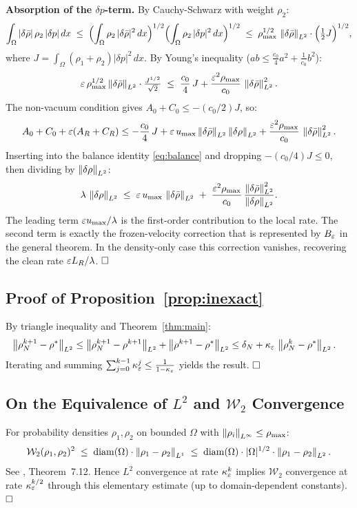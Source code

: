 \noindent\textbf{Absorption of the $\delta p$-term.}
By Cauchy-Schwarz with weight $\rho_2$:
\[
  \int_\Omega |\delta\bar\rho|\,\rho_2\,|\delta p|\,dx
  \;\leq\;
  \Bigl(\int_\Omega \rho_2\,|\delta\bar\rho|^2\,dx\Bigr)^{1/2}
  \Bigl(\int_\Omega \rho_2\,|\delta p|^2\,dx\Bigr)^{1/2}
  \;\leq\;
  \rho_{\max}^{1/2}\,\left\lVert \delta\bar\rho \right\rVert_{L^2}\cdot
  \Bigl(\tfrac{1}{2}J\Bigr)^{1/2},
\]
where $J = \int_\Omega(\rho_1+\rho_2)|\delta p|^2\,dx$.
By Young's inequality ($ab \leq \frac{c_0}{4}a^2 + \frac{1}{c_0}b^2$):
\[
  \varepsilon\,\rho_{\max}^{1/2}\left\lVert \delta\bar\rho \right\rVert_{L^2}\cdot\tfrac{J^{1/2}}{\sqrt 2}
  \;\leq\; \frac{c_0}{4}\,J + \frac{\varepsilon^2\rho_{\max}}{c_0}\,\left\lVert \delta\bar\rho \right\rVert_{L^2}^2.
\]
The non-vacuum condition gives $A_0+C_0 \leq -(c_0/2)J$, so:
\[
  A_0+C_0 + \varepsilon(A_R+C_R)
  \leq -\frac{c_0}{4}\,J
  + \varepsilon\,u_{\max}\left\lVert \delta\bar\rho \right\rVert_{L^2}\left\lVert \delta\rho \right\rVert_{L^2}
  + \frac{\varepsilon^2\rho_{\max}}{c_0}\,\left\lVert \delta\bar\rho \right\rVert_{L^2}^2.
\]
Inserting into the balance identity \eqref{eq:balance} and dropping
$-(c_0/4)J \leq 0$, then dividing by $\left\lVert \delta\rho \right\rVert_{L^2}$:
\[
  \lambda\,\left\lVert \delta\rho \right\rVert_{L^2}
  \;\leq\;
  \varepsilon\,u_{\max}\,\left\lVert \delta\bar\rho \right\rVert_{L^2}
  \;+\; \frac{\varepsilon^2\rho_{\max}}{c_0}\,
        \frac{\left\lVert \delta\bar\rho \right\rVert_{L^2}^2}{\left\lVert \delta\rho \right\rVert_{L^2}}.
\]
The leading term $\varepsilon u_{\max}/\lambda$ is the first-order contribution to
the local rate.  The second term is exactly the frozen-velocity correction that
is represented by \(B_\varepsilon\) in the general theorem.  In the density-only case
this correction vanishes, recovering the clean rate
\(\varepsilon L_R/\lambda\). $\hfill\square$

\subsection{Proof of Proposition~\ref{prop:inexact}}

By triangle inequality and Theorem~\ref{thm:main}:
\begin{align*}
  \left\lVert \rho^{k+1}_N - \rho^* \right\rVert_{L^2}
  &\leq \left\lVert \rho^{k+1}_N - \rho^{k+1} \right\rVert_{L^2}
   + \left\lVert \rho^{k+1} - \rho^* \right\rVert_{L^2}
  \leq \delta_N + \kappa_\varepsilon\,\left\lVert \rho^k_N - \rho^* \right\rVert_{L^2}.
\end{align*}
Iterating and summing
$\sum_{j=0}^{k-1}\kappa_\varepsilon^j \leq \frac{1}{1-\kappa_\varepsilon}$
yields the result. $\hfill\square$

\subsection{On the Equivalence of $L^2$ and $\mathcal{W}_2$ Convergence}
\label{app:wasserstein}

For probability densities $\rho_1,\rho_2$ on bounded $\Omega$ with
$\left\lVert \rho_i \right\rVert_{L^\infty} \leq \rho_{\max}$:
\[
  \mathcal{W}_2(\rho_1,\rho_2)^2
  \;\leq\; \mathrm{diam}(\Omega)\cdot\left\lVert \rho_1-\rho_2 \right\rVert_{L^1}
  \;\leq\; \mathrm{diam}(\Omega)\cdot|\Omega|^{1/2}\cdot\left\lVert \rho_1-\rho_2 \right\rVert_{L^2}.
\]
See \citet{villani2009optimal}, Theorem~7.12.
Hence $L^2$ convergence at rate $\kappa_\varepsilon^k$ implies $\mathcal{W}_2$
convergence at rate $\kappa_\varepsilon^{k/2}$ through this elementary estimate
(up to domain-dependent constants). $\hfill\square$
